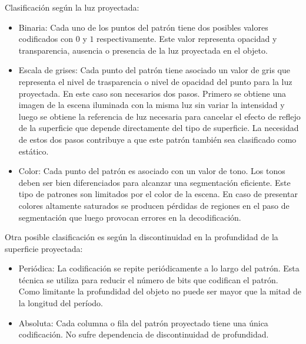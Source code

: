 Clasificación según la luz proyectada:
\begin{itemize}
	\item Binaria: Cada uno de los puntos del patrón tiene dos posibles valores codificados con $0$ y $1$ respectivamente. Este valor representa opacidad y transparencia, ausencia o presencia de la luz proyectada en el objeto.
	\item Escala de grises: Cada punto del patrón tiene asociado un valor de gris que representa el nivel de trasparencia o nivel de opacidad del punto para la luz proyectada. En este caso son necesarios dos pasos. Primero se obtiene una imagen de la escena iluminada con la misma luz sin variar la intensidad y luego se obtiene la referencia de luz necesaria para cancelar el efecto de reflejo de la superficie que depende directamente del tipo de superficie. La necesidad de estos dos pasos contribuye a que este patrón también sea clasificado como estático.
	\item Color: Cada punto del patrón es asociado con un valor de tono. Los tonos deben ser bien diferenciados para alcanzar una segmentación eficiente. Este tipo de patrones son limitados por el color de la escena. En caso de presentar colores altamente saturados se producen pérdidas de regiones en el paso de segmentación que luego provocan errores en la decodificación.
\end{itemize}

Otra posible clasificación es según la discontinuidad en la profundidad de la superficie proyectada:
\begin{itemize}
	\item Periódica: La codificación se repite periódicamente a lo largo del patrón. Esta técnica se utiliza para reducir el número de bits que codifican el patrón. Como limitante la profundidad del objeto no puede ser mayor que la mitad de la longitud del período.
	\item Absoluta: Cada columna o fila del patrón proyectado tiene una única codificación. No sufre dependencia de discontinuidad de profundidad.
\end{itemize}

